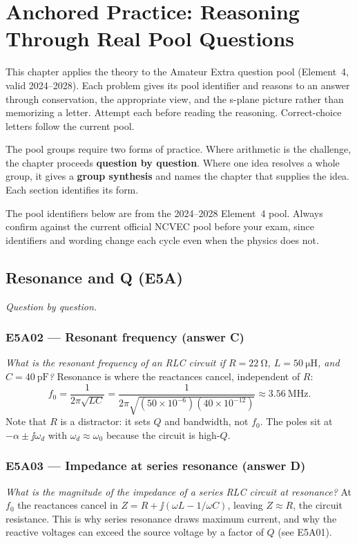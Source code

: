\chapter{Anchored Practice: Reasoning Through Real Pool Questions}
\label{ch:practice}
This chapter applies the theory to the Amateur Extra question pool
(Element~4, valid 2024--2028). Each problem gives its pool identifier and reasons
to an answer through conservation, the appropriate view, and the s-plane picture
rather than memorizing a letter. Attempt each before reading the reasoning.
Correct-choice letters follow the current pool.

The pool groups require two forms of practice. Where arithmetic is the challenge,
the chapter proceeds \textbf{question by question}. Where one idea resolves a whole
group, it gives a \textbf{group synthesis} and names the chapter that supplies the
idea. Each section identifies its form.

\begin{exambox}
The pool identifiers below are from the 2024--2028 Element~4 pool. Always confirm
against the current official NCVEC pool before your exam, since identifiers and
wording change each cycle even when the physics does not.
\end{exambox}

\section{Resonance and Q (E5A)}
\emph{Question by question.}

\subsection*{E5A02 --- Resonant frequency (answer C)}
\emph{What is the resonant frequency of an RLC circuit if \(R=\SI{22}{\ohm}\),
\(L=\SI{50}{\micro\henry}\), and \(C=\SI{40}{\pico\farad}\)?}
Resonance is where the reactances cancel, independent of \(R\):
\[
f_0=\frac{1}{2\pi\sqrt{LC}}
=\frac{1}{2\pi\sqrt{(50\times10^{-6})(40\times10^{-12})}}
\approx\SI{3.56}{\mega\hertz}.
\]
Note that \(R\) is a distractor: it sets \(Q\) and bandwidth, not \(f_0\). The
poles sit at \(-\alpha\pm\jj\omega_d\) with \(\omega_d\approx\omega_0\) because the
circuit is high-\(Q\).

\subsection*{E5A03 --- Impedance at series resonance (answer D)}
\emph{What is the magnitude of the impedance of a series RLC circuit at
resonance?} At \(f_0\) the reactances cancel in \(Z=R+\jj(\omega L-1/\omega C)\),
leaving \(Z\approx R\), the circuit resistance. This is why series
resonance draws maximum current, and why the reactive voltages can exceed the
source voltage by a factor of \(Q\) (see E5A01).

